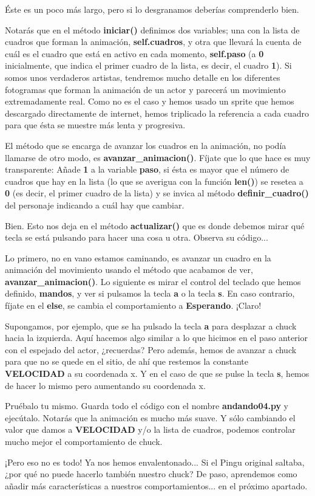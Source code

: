 \documentclass{article}
\begin{document}
Éste es un poco más largo, pero si lo desgranamos deberías comprenderlo bien.\par
Notarás que en el método \textbf{iniciar()} definimos dos variables; una con la lista de cuadros que forman la animación, \textbf{self.cuadros}, y otra que llevará la cuenta de cuál es el cuadro que está en activo en cada momento, \textbf{self.paso} (a \textbf{0} inicialmente, que indica el primer cuadro de la lista, es decir, el cuadro \textbf{1}). Si somos unos verdaderos artistas, tendremos mucho detalle en los diferentes fotogramas que forman la animación de un actor y parecerá un movimiento extremadamente real. Como no es el caso y hemos usado un sprite que hemos descargado directamente de internet, hemos triplicado la referencia a cada cuadro para que ésta se muestre más lenta y progresiva.\par
El método que se encarga de avanzar los cuadros en la animación, no podía llamarse de otro modo, es \textbf{avanzar\_animacion()}. Fíjate que lo que hace es muy transparente: Añade \textbf{1} a la variable \textbf{paso}, si ésta es mayor que el número de cuadros que hay en la lista (lo que se averigua con la función \textbf{len()}) se resetea a \textbf{0} (es decir, el primer cuadro de la lista) y se invica al método \textbf{definir\_cuadro()} del personaje indicando a cuál hay que cambiar.\par
Bien. Esto nos deja en el método \textbf{actualizar()} que es donde debemos mirar qué tecla se está pulsando para hacer una cosa u otra. Observa su código...\par
Lo primero, no en vano estamos caminando, es avanzar un cuadro en la animación del movimiento usando el método que acabamos de ver, \textbf{avanzar\_animacion()}. Lo siguiente es mirar el control del teclado que hemos definido, \textbf{mandos}, y ver si pulsamos la tecla \textbf{a} o la tecla \textbf{s}. En caso contrario, fíjate en el \textcolor{codepurple}{\textbf{else}}, se cambia el comportamiento a \textbf{Esperando}. ¡Claro!\par
Supongamos, por ejemplo, que se ha pulsado la tecla \textbf{a} para desplazar a chuck hacia la izquierda. Aquí hacemos algo similar a lo que hicimos en el paso anterior con el espejado del actor, ¿recuerdas? Pero además, hemos de avanzar a chuck para que no se quede en el sitio, de ahí que restemos la constante \textbf{VELOCIDAD} a su coordenada x. Y en el caso de que se pulse la tecla \textbf{s}, hemos de hacer lo mismo pero aumentando su coordenada x.\par
Pruébalo tu mismo. Guarda todo el código con el nombre \textbf{andando04.py} y ejecútalo. Notarás que la animación es mucho más suave. Y sólo cambiando el valor que damos a \textbf{VELOCIDAD} y/o la lista de cuadros, podemos controlar mucho mejor el comportamiento de chuck.\par
¡Pero eso no es todo! Ya nos hemos envalentonado... Si el Pingu original saltaba, ¿por qué no puede hacerlo también nuestro chuck? De paso, aprendemos como añadir más características a nuestros comportamientos... en el próximo apartado.\par
\end{document}
